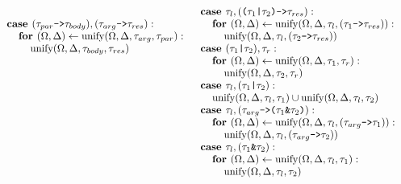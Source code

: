 \documentclass[acmsmall]{acmart}
\begin{document}
\begin{figure*}[h]
\[\begin{array}[t]{@{} l}
    \\

    \I \B{case } (\code{$\tau_{par}$->$\tau_{body}$}), (\code{$\tau_{arg}$->$\tau_{res}$}) : 
    \\
    \I\I \B{for } (\Omega, \Delta) \leftarrow \F{unify}(\Omega, \Delta, \tau_{arg}, \tau_{par}):
    \\
    \I\I\I \F{unify}(\Omega, \Delta, \tau_{body}, \tau_{res})
\end{array}
\begin{array}[t]{@{} l}
    \I \B{case } \tau_l, (\code{($\tau_1$|$\tau_2$)->$\tau_{res}$}) : 
    \\
    \I\I \B{for } (\Omega, \Delta) \leftarrow \F{unify}(\Omega, \Delta, \tau_l, (\code{$\tau_1$->$\tau_{res}$})):
    \\
    \I\I\I \F{unify}(\Omega, \Delta, \tau_l, (\code{$\tau_2$->$\tau_{res}$})) 

    \\

    \I \B{case } (\code{$\tau_1$|$\tau_2$}), \tau_r : 
    \\
    \I\I \B{for } (\Omega, \Delta) \leftarrow \F{unify}(\Omega, \Delta, \tau_1, \tau_r):
    \\
    \I\I\I \F{unify}(\Omega, \Delta, \tau_2, \tau_r) 

    \\

    \I \B{case } \tau_l, (\code{$\tau_1$|$\tau_2$}) : 
    \\
    \I\I \F{unify}(\Omega, \Delta, \tau_l, \tau_1) \cup \F{unify}(\Omega, \Delta, \tau_l, \tau_2) 

    \\

    \I \B{case } \tau_l, (\code{$\tau_{arg}$->($\tau_1$\&$\tau_2$)}) : 
    \\
    \I\I \B{for } (\Omega, \Delta) \leftarrow \F{unify}(\Omega, \Delta, \tau_l, (\code{$\tau_{arg}$->$\tau_1$})):
    \\
    \I\I\I \F{unify}(\Omega, \Delta, \tau_l, (\code{$\tau_{arg}$->$\tau_2$}))

    \\

    \I \B{case } \tau_l, (\code{$\tau_1$\&$\tau_2$}) : 
    \\
    \I\I \B{for } (\Omega, \Delta) \leftarrow \F{unify}(\Omega, \Delta, \tau_l, \tau_1):
    \\
    \I\I\I \F{unify}(\Omega, \Delta, \tau_l, \tau_2) 


\end{array}\]
\end{figure*}
\end{document}
